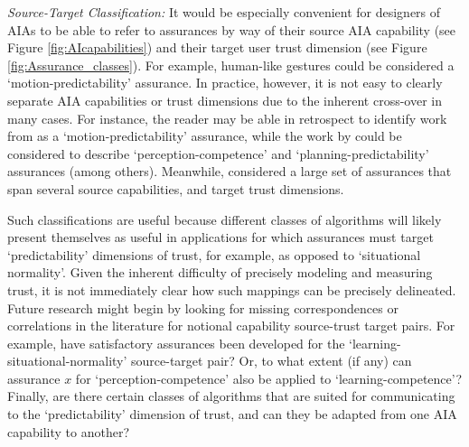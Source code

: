 \emph{Source-Target Classification:}
It would be especially convenient for designers of AIAs to be able to refer to assurances by way of their source AIA capability (see Figure \ref{fig:AIcapabilities}) and their target user trust dimension (see Figure \ref{fig:Assurance_classes}). 
For example, human-like gestures could be considered a `motion-predictability' assurance. In practice, however, it is not easy to clearly separate AIA capabilities or trust dimensions due to the inherent cross-over in many cases. For instance, the reader may be able in retrospect to identify work from \cite{Dragan2013-wd} as a `motion-predictability' assurance, while the work by \citet{Wang2016-id} could be considered to describe `perception-competence' and `planning-predictability' assurances (among others). Meanwhile, \citet{Aitken2016-fb} considered a large set of assurances that span several source capabilities, and target trust dimensions. 

Such classifications are useful because different classes of algorithms will likely present themselves as useful in applications for which assurances must target `predictability' dimensions of trust, for example, as opposed to `situational normality'. 
Given the inherent difficulty of precisely modeling and measuring trust, it is not immediately clear how such mappings can be precisely delineated.  
Future research might begin by looking for missing correspondences or correlations in the literature for notional capability source-trust target pairs. For example, have satisfactory assurances been developed for the `learning-situational-normality' source-target pair? Or, to what extent (if any) can assurance $x$ for `perception-competence' also be applied to `learning-competence'? Finally, are there certain classes of algorithms that are suited for communicating to the `predictability' dimension of trust, and can they be adapted from one AIA capability to another?
